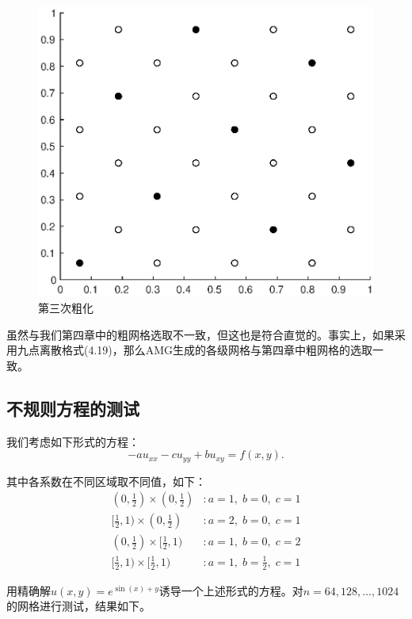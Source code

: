 \documentclass[lang=cn,10pt]{elegantbook}
\begin{document}
\begin{figure}[H]
  \hspace{.5em}
  \begin{minipage}[t]{0.32\linewidth}
    \centering
    \includegraphics[width=0.9\linewidth]{figure/4-1-3.eps}
    \caption*{\small 第三次粗化}
  \end{minipage}
\end{figure}

虽然与我们第四章中的粗网格选取不一致，但这也是符合直觉的。事实上，如果采用九点离散格式(4.19)，那么AMG生成的各级网格与第四章中粗网格的选取一致。

\subsection{不规则方程的测试}

我们考虑如下形式的方程：
\begin{equation}
  -au_{xx}-cu_{yy}+bu_{xy}=f(x,y).
\end{equation}

其中各系数在不同区域取不同值，如下：
\begin{align*}
  (0,\frac{1}{2})\times (0,\frac{1}{2})&: a=1,\;b=0,\;c=1 \\
  [\frac{1}{2},1)\times (0,\frac{1}{2})&: a=2,\;b=0,\;c=1 \\
  (0,\frac{1}{2})\times [\frac{1}{2},1)&: a=1,\;b=0,\;c=2 \\
  [\frac{1}{2},1)\times [\frac{1}{2},1)&: a=1,\;b=\frac{1}{2},\;c=1
\end{align*}

用精确解$u(x,y)=e^{\sin(x)+y}$诱导一个上述形式的方程。对$n=64,128,...,1024$的网格进行测试，结果如下。
\end{document}
